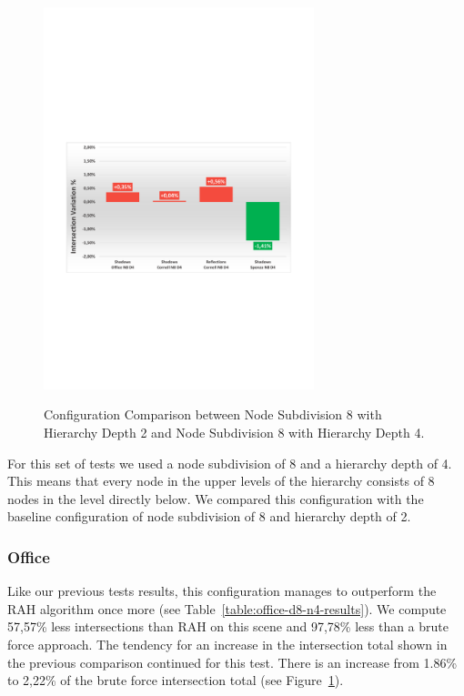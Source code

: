\begin{figure}[!htb]
    \begin{center}
    \includegraphics[width=0.70\textwidth]{Images/Chart_Comparison_N8_D2_N8_D4}
    \label{fig:comparison-results-d8-n2-d8-n4}
    \caption{Configuration Comparison between Node Subdivision 8 with Hierarchy Depth 2 and Node Subdivision 8 with Hierarchy Depth 4.}
    \end{center}
\end{figure}

For this set of tests we used a node subdivision of 8 and a hierarchy depth of 4. This means that every node in the upper levels of the hierarchy consists of 8 nodes in the level directly below. We compared this configuration with the baseline configuration of node subdivision of 8 and hierarchy depth of 2.

\subsubsection{Office}

Like our previous tests results, this configuration manages to outperform the RAH algorithm once more (see Table~\ref{table:office-d8-n4-results}). We compute 57,57\% less intersections than RAH on this scene and 97,78\% less than a brute force approach. The tendency for an increase in the intersection total shown in the previous comparison continued for this test. There is an increase from 1.86\% to 2,22\% of the brute force intersection total (see Figure~\ref{fig:comparison-results-d8-n2-d8-n4}).

